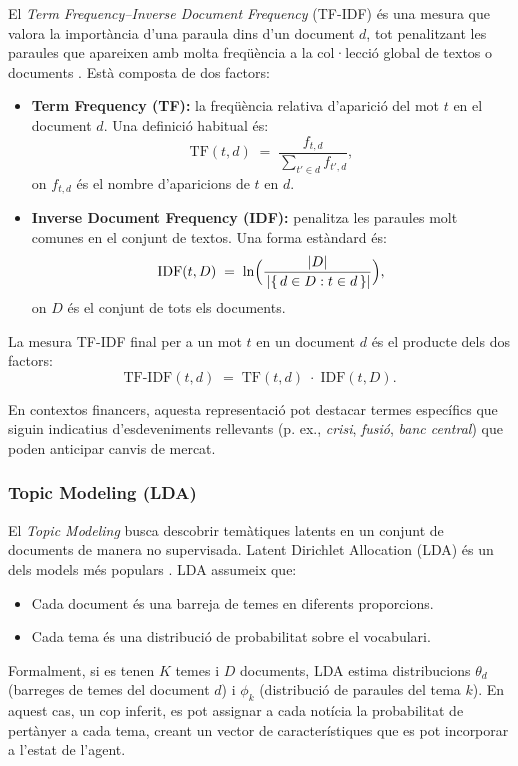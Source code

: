 \documentclass[12pt,a4paper,twoside]{book}
\begin{document}
El \emph{Term Frequency–Inverse Document Frequency} (TF-IDF) és una mesura que valora la importància d'una paraula dins d'un document $d$, tot penalitzant les paraules que apareixen amb molta freqüència a la col·lecció global de textos o documents \cite{Ramos2003}. Està composta de dos factors:

\begin{itemize}
\item \textbf{Term Frequency (TF):} la freqüència relativa d'aparició del mot $t$ en el document $d$. Una definició habitual és:
\[
\mathrm{TF}(t,d) \;=\; \frac{f_{t,d}}{\sum_{t' \in d} f_{t',d}},
\]
on $f_{t,d}$ és el nombre d'aparicions de $t$ en $d$.
\item \textbf{Inverse Document Frequency (IDF):} penalitza les paraules molt comunes en el conjunt de textos. Una forma estàndard és:
\[
\mathrm{IDF}(t,D) \;=\; \ln \Bigl(\frac{|D|}{\,|\{\,d \in D : t \in d\,\}|}\Bigr),
\]
on $D$ és el conjunt de tots els documents.
\end{itemize}

La mesura TF-IDF final per a un mot $t$ en un document $d$ és el producte dels dos factors:
\[
\mathrm{TF\text{-}IDF}(t,d) \;=\; \mathrm{TF}(t,d)\;\cdot\;\mathrm{IDF}(t,D).
\]

En contextos financers, aquesta representació pot destacar termes específics que siguin indicatius d'esdeveniments rellevants (p. ex., \emph{crisi}, \emph{fusió}, \emph{banc central}) que poden anticipar canvis de mercat.

\subsubsection{Topic Modeling (LDA)}

El \emph{Topic Modeling} busca descobrir temàtiques latents en un conjunt de documents de manera no supervisada. Latent Dirichlet Allocation (LDA) és un dels models més populars \cite{Blei2003}. LDA assumeix que:

\begin{itemize}
\item Cada document és una barreja de temes en diferents proporcions.
\item Cada tema és una distribució de probabilitat sobre el vocabulari.
\end{itemize}

Formalment, si es tenen $K$ temes i $D$ documents, LDA estima distribucions $\theta_d$ (barreges de temes del document $d$) i $\phi_k$ (distribució de paraules del tema $k$). En aquest cas, un cop inferit, es pot assignar a cada notícia la probabilitat de pertànyer a cada tema, creant un vector de característiques que es pot incorporar a l'estat de l'agent.
\end{document}

